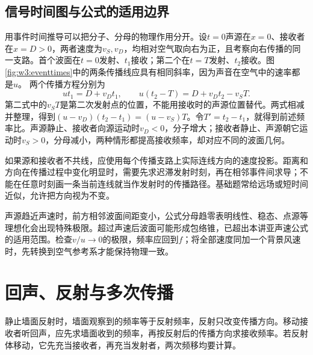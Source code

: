 \subsection{信号时间图与公式的适用边界}
用事件时间推导可以把分子、分母的物理作用分开。设$t=0$声源在$x=0$、接收者在$x=D>0$，两者速度为$v_S,v_D$，均相对空气取向右为正，且考察向右传播的同一支路。首个波面在$t=0$发射、$t_1$接收；第二个在$t=T$发射、$t_2$接收。图\ref{fig:w3:eventtimes}中的两条传播线应具有相同斜率，因为声音在空气中的速率都是$u$。
两个传播方程分别为
\[
ut_1=D+v_Dt_1,\qquad
u(t_2-T)=D+v_Dt_2-v_ST.
\]
第二式中的$v_ST$是第二次发射点的位置，不能用接收时的声源位置替代。两式相减并整理，得到$(u-v_D)(t_2-t_1)=(u-v_S)T$。令$T'=t_2-t_1$，就得到前述频率比。声源静止、接收者向源运动时$v_D<0$，分子增大；接收者静止、声源朝它运动时$v_S>0$，分母减小，两种情形都提高接收频率，却对应不同的波面几何。

如果源和接收者不共线，应使用每个传播支路上实际连线方向的速度投影。距离和方向在传播过程中变化明显时，需要先求迟滞发射时刻，再在相邻事件间求导；不能在任意时刻画一条当前连线就当作发射时的传播路径。基础题常给远场或短时间近似，允许把方向视为不变。

声源趋近声速时，前方相邻波面间距变小，公式分母趋零表明线性、稳态、点源等理想化会出现特殊极限。超过声速后波面可能形成包络锥，已超出本讲亚声速公式的适用范围。检查$v/u\to0$的极限，频率应回到$f$；将全部速度同加一个背景风速时，先转换到空气参考系才能保持物理一致。


\section{回声、反射与多次传播}
静止墙面反射时，墙面观察到的频率等于反射频率，反射只改变传播方向。移动接收者听回声，应先求墙面收到的频率，再按反射后的传播方向求接收频率。若反射体移动，它先充当接收者，再充当发射者，两次频移均要计算。

